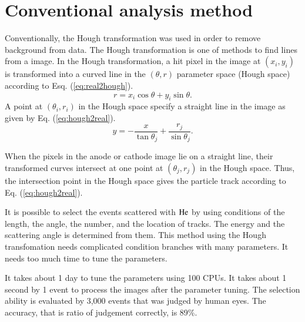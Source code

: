 \documentclass{jps-cp}
\begin{document}
\section{Conventional analysis method}
Conventionally, the Hough transformation was used in order to remove background from data.
The Hough transformation is one of methods to find lines from a image.
In the Hough transformation, a hit pixel in the image at $(x_{i}, y_{i})$ is transformed into
a curved line in the $(\theta, r)$ parameter space (Hough space)
according to Esq. (\ref{eq:real2hough}).
\begin{equation}
  \label{eq:real2hough}
  r = x_{i}\cos\theta+y_{i}\sin\theta. 
\end{equation}
A point at $(\theta_{i}, r_{i})$ in the Hough space specify a straight line
in the image as given by Eq. (\ref{eq:hough2real}).
\begin{equation}
  \label{eq:hough2real}
  y = -\frac{x}{\tan\theta_{j}}+\frac{r_{j}}{\sin\theta_{j}}. 
\end{equation}

When the pixels in the anode or cathode image lie on a straight line,
their transformed curves intersect at one point at $(\theta_{j}, r_{j})$ in the Hough space.
Thus, the intersection point in the Hough space gives the particle track according to Eq. (\ref{eq:hough2real}).

It is possible to select the events scattered with $\rm{He}$ by using conditions of
the length, the angle, the number, and the location of tracks.
The energy and the scattering angle is determined from them.
This method using the Hough transfomation needs complicated condition branches with many parameters.
It needs too much time to tune the parameters.

It takes about 1 day to tune the parameters using 100 CPUs.
It takes about 1 second by 1 event to process the images after the parameter tuning.
The selection ability is evaluated by 3,000 events that was judged by human eyes.
The accuracy, that is ratio of judgement correctly, is 89\%.
\end{document}
